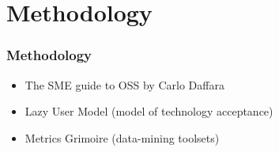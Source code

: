 \section{Methodology}

\begin{frame}%
\frametitle{Methodology}

\begin{itemize}
  \item The SME guide to OSS by Carlo Daffara
  \item Lazy User Model (model of technology acceptance)
  \item Metrics Grimoire (data-mining toolsets)
\end{itemize}

\end{frame}
